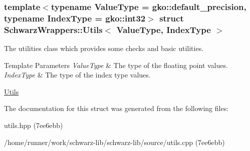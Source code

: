\subsubsection*{template$<$typename Value\+Type = gko\+::default\+\_\+precision, typename Index\+Type = gko\+::int32$>$\newline
struct Schwarz\+Wrappers\+::\+Utils$<$ Value\+Type, Index\+Type $>$}

The utilities class which provides some checks and basic utilities. 


\begin{DoxyTemplParams}{Template Parameters}
{\em Value\+Type} & The type of the floating point values. \\
\hline
{\em Index\+Type} & The type of the index type values.\\
\hline
\end{DoxyTemplParams}
\hyperlink{group__utils}{Utils} 

The documentation for this struct was generated from the following files\+:\begin{DoxyCompactItemize}
\item 
utils.\+hpp (7ee6ebb)\item 
/home/runner/work/schwarz-\/lib/schwarz-\/lib/source/utils.\+cpp (7ee6ebb)\end{DoxyCompactItemize}
